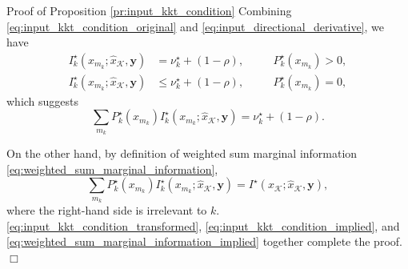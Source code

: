 \documentclass[journal]{IEEEtran}
\renewcommand{\qedsymbol}{\hfill\ensuremath{\Box}}
\begin{document}
\begin{appendix}
\begin{subsection}{Proof of Proposition \ref{pr:input_kkt_condition}}
		Combining \eqref{eq:input_kkt_condition_original} and \eqref{eq:input_directional_derivative}, we have
		\begin{subequations}
			\label{eq:input_kkt_condition_transformed}
			\begin{alignat}{2}
				I_k^\star(x_{m_k};\hat{x}_{\mathcal{K}},\boldsymbol{y}) & = \nu_k^\star + (1 - \rho), \quad   &  & P_k^\star(x_{m_k}) > 0,\label{eq:probable_states_marginal} \\
				I_k^\star(x_{m_k};\hat{x}_{\mathcal{K}},\boldsymbol{y}) & \le \nu_k^\star + (1 - \rho), \quad &  & P_k^\star(x_{m_k}) = 0,\label{eq:dropped_states_marginal}
			\end{alignat}
		\end{subequations}
		which suggests
		\begin{equation}
			\sum_{m_k} P_k^\star(x_{m_k}) I_k^\star(x_{m_k};\hat{x}_{\mathcal{K}},\boldsymbol{y}) = \nu_k^\star + (1 - \rho).
			\label{eq:input_kkt_condition_implied}
		\end{equation}

		On the other hand, by definition of weighted sum marginal information \eqref{eq:weighted_sum_marginal_information},
		\begin{equation}
			\sum_{m_k} P_k^\star(x_{m_k}) I_k^\star(x_{m_k};\hat{x}_{\mathcal{K}},\boldsymbol{y}) = I^\star(x_{\mathcal{K}};\hat{x}_{\mathcal{K}},\boldsymbol{y}),
			\label{eq:weighted_sum_marginal_information_implied}
		\end{equation}
		where the right-hand side is irrelevant to $k$.
		\eqref{eq:input_kkt_condition_transformed}, \eqref{eq:input_kkt_condition_implied}, and \eqref{eq:weighted_sum_marginal_information_implied} together complete the proof.
		\qedsymbol
		\label{ap:input_kkt_condition}
	\end{subsection}


\end{appendix}
\end{document}
